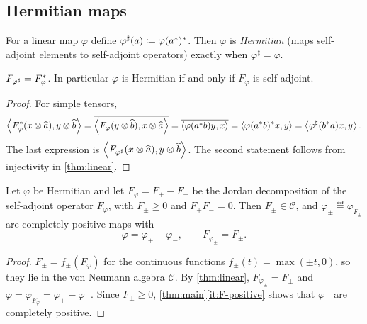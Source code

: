 \documentclass[12pt]{article}
\newcommand{\ip}[2]{\left\langle #1 , #2 \right\rangle}
\newcommand{\vect}[1]{\widehat{#1}}        %
\newcommand{\Fphi}{F_{\varphi}}            %
\begin{document}
\subsection{Hermitian maps}
\label{sec:hermitian}

For a linear map \(\varphi\) define \(\varphi^\sharp(a) \coloneqq \varphi(a^*)^*\).
Then \(\varphi\) is \emph{Hermitian} (maps self-adjoint elements to self-adjoint
operators) exactly when \(\varphi^\sharp = \varphi\).

\begin{lemma}
\label{lem:F-adjoint}
\(F_{\varphi^\sharp} = \Fphi^\adjoint\). In particular \(\varphi\) is Hermitian if and
only if \(\Fphi\) is self-adjoint.
\end{lemma}
\begin{proof}
For simple tensors,
\[
  \ip{\Fphi^\adjoint (x \tensor \vect{a})}{y \tensor \vect{b}}
  = \overline{\ip{\Fphi (y \tensor \vect{b})}{x \tensor \vect{a}}}
  = \overline{\ip{\varphi(a^\adjoint b) y}{x}}
  = \ip{\varphi(a^\adjoint b)^\adjoint x}{y}
  = \ip{\varphi^\sharp(b^\adjoint a) x}{y}.
\]
The last expression is \(\ip{F_{\varphi^\sharp}(x \tensor \vect{a})}{y \tensor \vect{b}}\).
The second statement follows from injectivity in \cref{thm:linear}.
\end{proof}

\begin{theorem}
\label{thm:jordan}
Let \(\varphi\) be Hermitian and let \(\Fphi = F_+ - F_-\) be the Jordan
decomposition of the self-adjoint operator \(\Fphi\), with \(F_\pm \ge 0\) and
\(F_+ F_- = 0\). Then \(F_\pm \in \mathcal{C}\), and \(\varphi_\pm \eqdef \varphi_{F_\pm}\) are
completely positive maps with
\[
  \varphi = \varphi_+ - \varphi_-, \qquad F_{\varphi_\pm} = F_\pm .
\]
\end{theorem}
\begin{proof}
\(F_\pm = f_\pm(\Fphi)\) for the continuous functions \(f_\pm(t) = \max(\pm t, 0)\),
so they lie in the von Neumann algebra \(\mathcal{C}\). By \cref{thm:linear},
\(F_{\varphi_\pm} = F_\pm\) and \(\varphi = \varphi_{\Fphi} = \varphi_+ - \varphi_-\).
Since \(F_\pm \ge 0\), \cref{thm:main}\ref{it:F-positive} shows that \(\varphi_\pm\)
are completely positive.
\end{proof}
\end{document}
